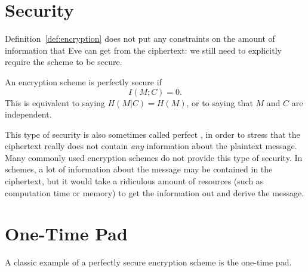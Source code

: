 \section{Security}
Definition~\ref{def:encryption} does not put any constraints on the amount of information that Eve can get from the ciphertext: we still need to explicitly require the scheme to be secure.

\begin{definition}
An encryption scheme is perfectly secure if
\[
I(M;C) = 0.
\]
This is equivalent to saying $H(M|C) = H(M)$, or to saying that $M$ and $C$ are independent.
\end{definition}
This type of security is also sometimes called perfect , in order to stress that the ciphertext really does not contain \emph{any} information about the plaintext message. Many commonly used encryption schemes do not provide this type of security. In  schemes, a lot of information about the message may be contained in the ciphertext, but it would take a ridiculous amount of resources (such as computation time or memory) to get the information out and derive the message.


\section{One-Time Pad}
A classic example of a perfectly secure encryption scheme is the one-time pad.

